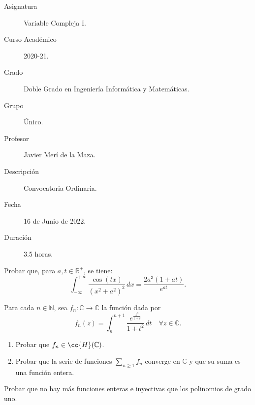 \documentclass[12pt]{article}
\begin{document}

    
    

    \begin{description}
        \item[Asignatura] Variable Compleja I.
        \item[Curso Académico] 2020-21.
        \item[Grado] Doble Grado en Ingeniería Informática y Matemáticas.
        \item[Grupo] Único.
        \item[Profesor] Javier Merí de la Maza.
        \item[Descripción] Convocatoria Ordinaria.
        \item[Fecha] 16 de Junio de 2022.
        \item[Duración] 3.5 horas.
    \end{description}
    \newpage

    \begin{ejercicio}[2.5 puntos]
        Probar que, para $a, t \in \mathbb{R}^+$, se tiene:
        \[
            \int_{-\infty}^{+\infty} \frac{\cos(tx)}{(x^2 + a^2)^2} \, dx = \frac{2a^3 (1 + at)}{e^{at}}.
        \]
    \end{ejercicio}

    \begin{ejercicio}[2.5 puntos]
        Para cada $n \in \mathbb{N}$, sea $f_n : \mathbb{C} \to \mathbb{C}$ la función dada por
        \[
            f_n(z) = \int_n^{n+1} \frac{e^{\frac{z^3}{1+t}}}{1 + t^2} \, dt \quad \forall z \in \mathbb{C}.
        \]
        \begin{enumerate}
            \item Probar que $f_n \in \cc{H}(\mathbb{C})$.
            \item Probar que la serie de funciones $\sum\limits_{n\geq 1} f_n$ converge en $\mathbb{C}$ y que su suma es una función entera.
        \end{enumerate}
    \end{ejercicio}

    \begin{ejercicio}[2.5 puntos]
        Probar que no hay más funciones enteras e inyectivas que los polinomios de grado uno.
    \end{ejercicio}
\end{document}
